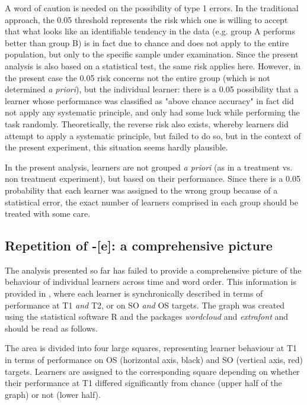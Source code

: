 A word of caution is needed on the possibility of type 1 errors. In the traditional approach, the 0.05 threshold represents the risk which one is willing to accept that what looks like an identifiable tendency in the data (e.g. group A performs better than group B) is in fact due to chance and does not apply to the entire population, but only to the specific sample under examination. Since the present analysis is also based on a statistical test, the same risk applies here. However, in the present case the 0.05 risk concerns not the entire group (which is not determined \textit{a priori}), but the individual learner: there is a 0.05 possibility that a learner whose performance was classified as "above chance accuracy" in fact did not apply any systematic principle, and only had some luck while performing the task randomly. Theoretically, the reverse risk also exists, whereby learners did attempt to apply a systematic principle, but failed to do so, but in the context of the present experiment, this situation seems hardly plausible. 

In the present analysis, learners are not grouped \textit{a priori} (as in a treatment vs. non treatment experiment), but based on their performance. Since there is a 0.05 probability that each learner was assigned to the wrong group because of a statistical error, the exact number of learners comprised in each group should be treated with some care.

\subsection{Repetition of -[e]: a comprehensive picture}\label{sec:04:2.4.1} %
The analysis presented so far has failed to provide a comprehensive picture of the behaviour of individual learners across time and word order. This information is provided in , where each learner is synchronically described in terms of performance at T1 \textit{and} T2, or on SO \textit{and} OS targets. The graph was created using the statistical software R \citep{RCoreTeam2017} and the packages \textit{wordcloud} \citep{Fellows2014} and \textit{extrafont} \citep{Chang2014} and should be read as follows.

The area is divided into four large squares, representing learner behaviour at T1 in terms of performance on OS (horizontal axis, black) and SO (vertical axis, red) targets. Learners are assigned to the corresponding square depending on whether their performance at T1 differed significantly from chance (upper half of the graph) or not (lower half). 

